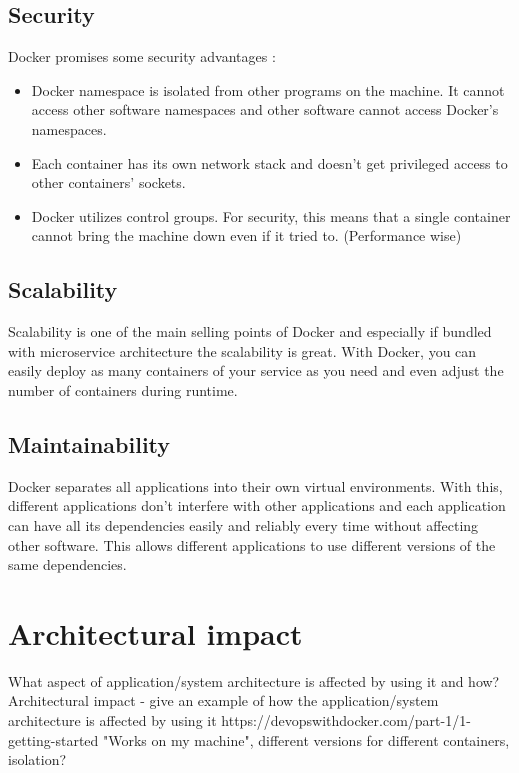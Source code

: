 \documentclass[fleqn,12pt]{olplainarticle}
\begin{document}
\subsection{Security}
Docker promises some security advantages \citep{docker:security}:
\begin{itemize}
    \item  Docker namespace is isolated from other programs on the machine. It cannot access other software namespaces and other software cannot access Docker's namespaces. 
    \item Each container has its own network stack and doesn't get privileged access to other containers' sockets.
    \item Docker utilizes control groups. For security, this means that a single container cannot bring the machine down even if it tried to. (Performance wise)
    
\end{itemize}


\subsection{Scalability}
Scalability is one of the main selling points of Docker and especially if bundled with microservice architecture the scalability is great. With Docker, you can easily deploy as many containers of your service as you need and even adjust the number of containers during runtime.

\subsection{Maintainability}
Docker separates all applications into their own virtual environments. With this, different applications don't interfere with other applications and each application can have all its dependencies easily and reliably every time without affecting other software. This allows different applications to use different versions of the same dependencies.

\section{Architectural impact}

What aspect of application/system architecture is affected by using it and how?
Architectural impact - give an example of how the application/system architecture is affected by using it
https://devopswithdocker.com/part-1/1-getting-started
"Works on my machine", different versions for different containers, isolation?
\end{document}
